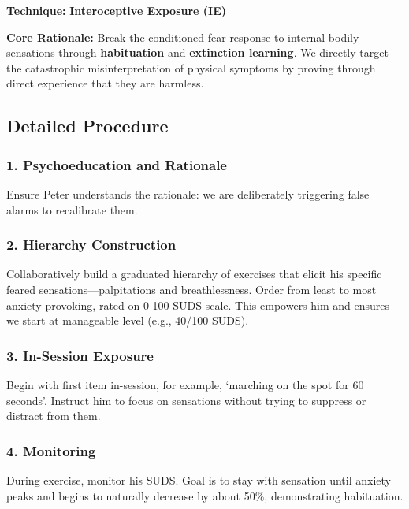 \documentclass[
  american,
  letterpaper,
  DIV=11,
  numbers=noendperiod]{scrartcl}
\begin{document}
\textbf{Technique:} \textbf{Interoceptive Exposure (IE)}

\textbf{Core Rationale:} Break the conditioned fear response to internal
bodily sensations through \textbf{habituation} and \textbf{extinction
learning}. We directly target the catastrophic misinterpretation of
physical symptoms by proving through direct experience that they are
harmless.

\subsection{Detailed Procedure}\label{detailed-procedure}

\subsubsection{1. Psychoeducation and
Rationale}\label{psychoeducation-and-rationale}

Ensure Peter understands the rationale: we are deliberately triggering
false alarms to recalibrate them.

\subsubsection{2. Hierarchy Construction}\label{hierarchy-construction}

Collaboratively build a graduated hierarchy of exercises that elicit his
specific feared sensations---palpitations and breathlessness. Order from
least to most anxiety-provoking, rated on 0-100 SUDS scale. This
empowers him and ensures we start at manageable level (e.g., 40/100
SUDS).

\subsubsection{3. In-Session Exposure}\label{in-session-exposure}

Begin with first item in-session, for example, `marching on the spot for
60 seconds'. Instruct him to focus on sensations without trying to
suppress or distract from them.

\subsubsection{4. Monitoring}\label{monitoring}

During exercise, monitor his SUDS. Goal is to stay with sensation until
anxiety peaks and begins to naturally decrease by about 50\%,
demonstrating habituation.
\end{document}
